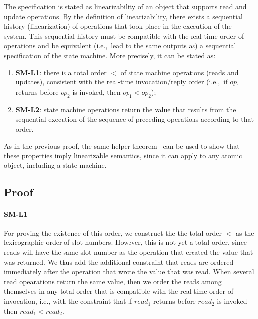 The specification is stated as linearizability of an object that
supports read and update operations. By the definition of
linearizability, there exists a sequential history
(linearization) of operations that took place in the execution of
the system. This sequential history must be compatible with the
real time order of operations and be equivalent (i.e.,\ lead to
the same outputs as) a sequential specification of the state machine.
More precisely,
it can be stated as:

\begin{enumerate}
    \item [] \textbf{SM-L1}: there is a total order $<$ of state machine operations
        (reads and updates), consistent with the real-time
        invocation/reply order (i.e.,\ if $op_1$ returns before
        $op_2$ is invoked, then $op_1 < op_2$);

      \item [] \textbf{SM-L2}: state machine operations return the value that results from the
        sequential execution of the sequence of preceding operations
        according to that order.
\end{enumerate}

As in the previous proof, the same helper theorem~\cite{nancy-book} can
be used to show that these properties imply linearizable semantics, since
it can apply to any atomic object, including a state machine.


\subsection{Proof}


\paragraph{SM-L1}
For proving the existence of this order, we construct the
the total order $<$ as the lexicographic order of slot numbers.
However, this is not yet a total order, since reads will have the same
slot number as the operation that created the value that was returned. We
thus add the additional constraint that reads are ordered immediately
after the operation that wrote the value that was read. When several
read opearations return the same value, then we order the
reads among themselves in any total order that is compatible with the
real-time order of invocation, i.e., with the constraint that
if $read_1$ returns before $read_2$ is invoked then $read_1 < read_2$.

